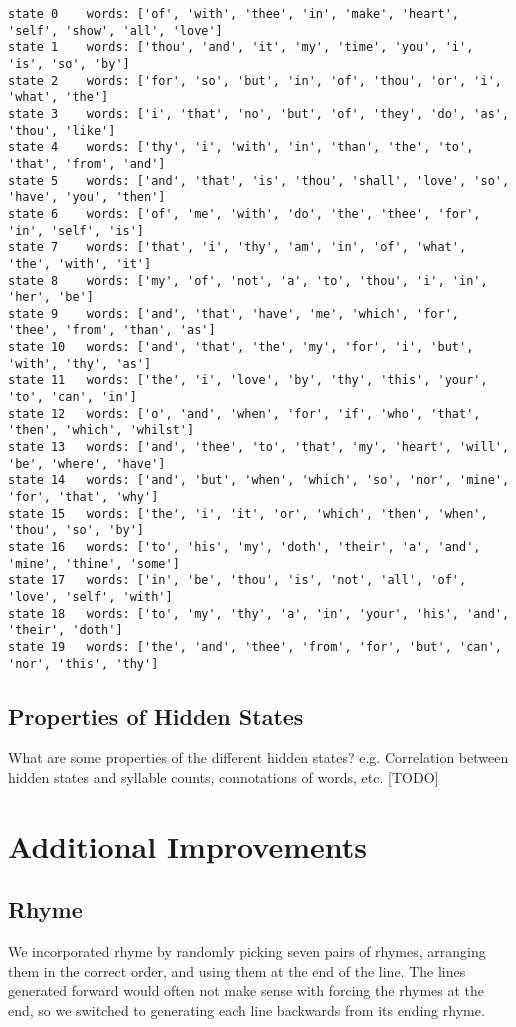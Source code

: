 \begin{lstlisting}[mathescape]
state 0    words: ['of', 'with', 'thee', 'in', 'make', 'heart', 'self', 'show', 'all', 'love']
state 1    words: ['thou', 'and', 'it', 'my', 'time', 'you', 'i', 'is', 'so', 'by']
state 2    words: ['for', 'so', 'but', 'in', 'of', 'thou', 'or', 'i', 'what', 'the']
state 3    words: ['i', 'that', 'no', 'but', 'of', 'they', 'do', 'as', 'thou', 'like']
state 4    words: ['thy', 'i', 'with', 'in', 'than', 'the', 'to', 'that', 'from', 'and']
state 5    words: ['and', 'that', 'is', 'thou', 'shall', 'love', 'so', 'have', 'you', 'then']
state 6    words: ['of', 'me', 'with', 'do', 'the', 'thee', 'for', 'in', 'self', 'is']
state 7    words: ['that', 'i', 'thy', 'am', 'in', 'of', 'what', 'the', 'with', 'it']
state 8    words: ['my', 'of', 'not', 'a', 'to', 'thou', 'i', 'in', 'her', 'be']
state 9    words: ['and', 'that', 'have', 'me', 'which', 'for', 'thee', 'from', 'than', 'as']
state 10   words: ['and', 'that', 'the', 'my', 'for', 'i', 'but', 'with', 'thy', 'as']
state 11   words: ['the', 'i', 'love', 'by', 'thy', 'this', 'your', 'to', 'can', 'in']
state 12   words: ['o', 'and', 'when', 'for', 'if', 'who', 'that', 'then', 'which', 'whilst']
state 13   words: ['and', 'thee', 'to', 'that', 'my', 'heart', 'will', 'be', 'where', 'have']
state 14   words: ['and', 'but', 'when', 'which', 'so', 'nor', 'mine', 'for', 'that', 'why']
state 15   words: ['the', 'i', 'it', 'or', 'which', 'then', 'when', 'thou', 'so', 'by']
state 16   words: ['to', 'his', 'my', 'doth', 'their', 'a', 'and', 'mine', 'thine', 'some']
state 17   words: ['in', 'be', 'thou', 'is', 'not', 'all', 'of', 'love', 'self', 'with']
state 18   words: ['to', 'my', 'thy', 'a', 'in', 'your', 'his', 'and', 'their', 'doth']
state 19   words: ['the', 'and', 'thee', 'from', 'for', 'but', 'can', 'nor', 'this', 'thy']
\end{lstlisting}

\subsection{Properties of Hidden States}
What are some properties of the different hidden states?
e.g. Correlation between hidden states and syllable counts, connotations of words, etc.
[TODO]


\section{Additional Improvements}
\subsection{Rhyme}
We incorporated rhyme by randomly picking seven pairs of rhymes, arranging them in the correct order, and using them at the end of the line. The lines generated forward would often not make sense with forcing the rhymes at the end, so we switched to generating each line backwards from its ending rhyme.


